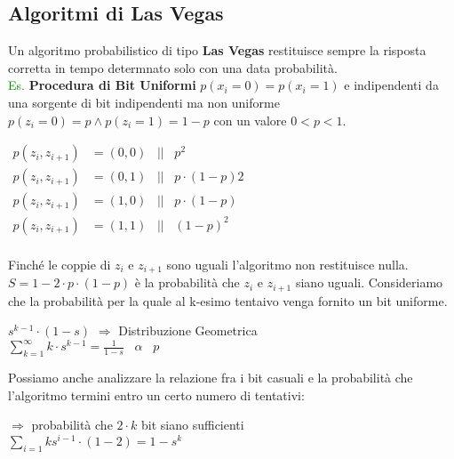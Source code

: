 \subsection{Algoritmi di Las Vegas}
Un algoritmo probabilistico di tipo \textbf{Las Vegas} restituisce sempre la risposta corretta in tempo determnato solo con una data probabilità.
\\ \newline
\textcolor{green}{Es.} \textbf{Procedura di Bit Uniformi} $p(x_i = 0) = p(x_i = 1)$ e indipendenti da una sorgente di bit indipendenti ma non uniforme $p(z_i = 0) = p \land p(z_i = 1) = 1 - p$ con un valore $0 < p < 1$.
\begin{center}
    \begin{math}
        \begin{aligned}
                p(z_i, z_{i + 1}) &= (0, 0) \;\;\; || \;\;\; p^2 \\
                p(z_i, z_{i + 1}) &= (0, 1) \;\;\; || \;\;\; p \cdot (1 - p)2 \\
                p(z_i, z_{i + 1}) &= (1, 0) \;\;\; || \;\;\; p \cdot (1 - p) \\
                p(z_i, z_{i + 1}) &= (1, 1) \;\;\; || \;\;\; (1 - p)^2 \\
        \end{aligned}
    \end{math}
\end{center}
Finché le coppie di $z_i$ e $z_{i + 1}$ sono uguali l'algoritmo non restituisce nulla. $S = 1 - 2 \cdot p \cdot (1 - p)$ è la probabilità che $z_i$ e $z_{i + 1}$ siano uguali. Consideriamo che la probabilità per la quale al k-esimo tentaivo venga fornito un bit uniforme.
\begin{center}
    $s^{k - 1} \cdot (1 - s)$ $\Rightarrow$ Distribuzione Geometrica \\
    $\sum_{k = 1}^{\infty}{k \cdot s^{k - 1}} = \frac{1}{1 - s} \;\;\; \alpha \;\;\; p$
\end{center}
Possiamo anche analizzare la relazione fra i bit casuali e la probabilità che l'algoritmo termini entro un certo numero di tentativi: \\
\begin{center}
    $\Rightarrow$ probabilità che $2 \cdot k$ bit siano sufficienti \\
    $\sum_{i = 1}{k}{s^{i - 1} \cdot (1 - 2)} = 1 - s^k$
\end{center}

